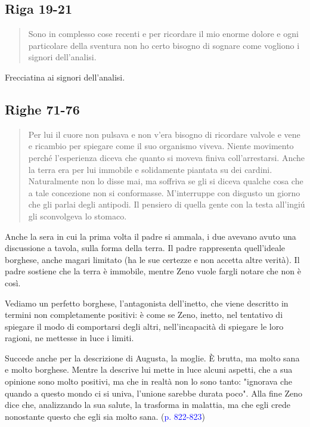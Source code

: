 \documentclass[a4paper, twoside, titlepage]{book}
\renewcommand{\emph}[1]{\textcolor{blue}{#1}}
\begin{document}
\subsection*{Riga 19-21}

\begin{quotation}
Sono in complesso cose recenti e per ricordare il mio enorme dolore e ogni particolare della sventura non ho certo bisogno di sognare come vogliono i signori dell’analisi.
\end{quotation}

Frecciatina ai signori dell'analisi.

\subsection*{Righe 71-76}

\begin{quotation}
Per lui il cuore non pulsava e non v’era bisogno di ricordare valvole e vene e ricambio per spiegare come il suo organismo viveva. Niente movimento perché l’esperienza diceva che quanto si moveva finiva coll’arrestarsi. Anche la terra era per lui immobile e solidamente piantata su dei cardini. Naturalmente non lo disse mai, ma soffriva se gli si diceva qualche cosa che a tale concezione non si conformasse. M’interruppe con disgusto un giorno che gli parlai degli antipodi. Il pensiero di quella gente con la testa all’ingiú gli sconvolgeva lo stomaco.
\end{quotation}

Anche la sera in cui la prima volta il padre si ammala, i due avevano avuto una discussione a tavola, sulla forma della terra. Il padre rappresenta quell'ideale borghese, anche magari limitato (ha le sue certezze e non accetta altre verità). Il padre sostiene che la terra è immobile, mentre Zeno vuole fargli notare che non è così.

Vediamo un perfetto borghese, l'antagonista dell'inetto, che viene descritto in termini non completamente positivi: è come se Zeno, inetto, nel tentativo di spiegare il modo di comportarsi degli altri, nell'incapacità di spiegare le loro ragioni, ne mettesse in luce i limiti.

Succede anche per la descrizione di Augusta, la moglie. È brutta, ma molto sana e molto borghese. Mentre la descrive lui mette in luce alcuni aspetti, che a sua opinione sono molto positivi, ma che in realtà non lo sono tanto: "ignorava che quando a questo mondo ci si univa, l'unione sarebbe durata poco". Alla fine Zeno dice che, analizzando la sua salute, la trasforma in malattia, ma che egli crede nonostante questo che egli sia molto sana. (\emph{p. 822-823})
\end{document}
